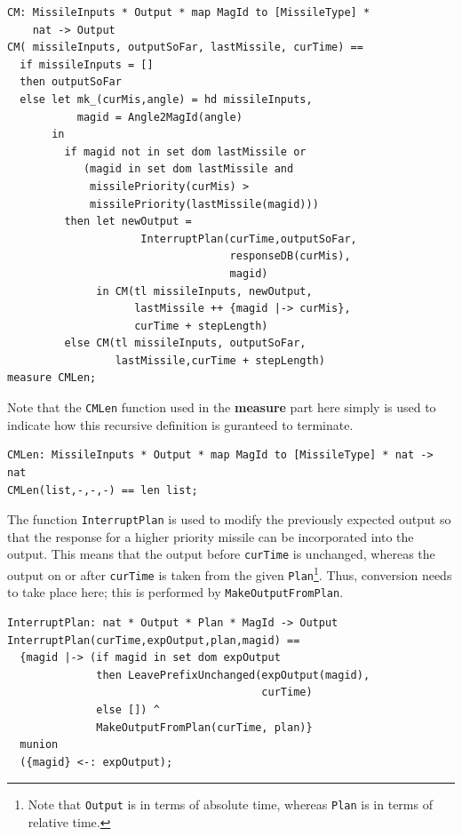 \documentclass{overturerepchap}
\begin{document}
\begin{lstlisting}
CM: MissileInputs * Output * map MagId to [MissileType] * 
    nat -> Output
CM( missileInputs, outputSoFar, lastMissile, curTime) ==
  if missileInputs = []
  then outputSoFar
  else let mk_(curMis,angle) = hd missileInputs,
           magid = Angle2MagId(angle)
       in
         if magid not in set dom lastMissile or
            (magid in set dom lastMissile and
             missilePriority(curMis) > 
             missilePriority(lastMissile(magid)))
         then let newOutput = 
                     InterruptPlan(curTime,outputSoFar,
                                   responseDB(curMis),
                                   magid)
              in CM(tl missileInputs, newOutput, 
                    lastMissile ++ {magid |-> curMis},
                    curTime + stepLength)
         else CM(tl missileInputs, outputSoFar, 
                 lastMissile,curTime + stepLength)
measure CMLen;
\end{lstlisting}

\noindent Note that the \texttt{CMLen} function used in the
          {\bf\ttfamily measure} part here simply is used to indicate
          how this recursive definition is guranteed to terminate.

\begin{lstlisting}
CMLen: MissileInputs * Output * map MagId to [MissileType] * nat -> nat
CMLen(list,-,-,-) == len list;
\end{lstlisting}

The function \texttt{InterruptPlan} is used to modify the previously
expected output so that the response for a higher priority missile can
be incorporated into the output. This means that the output before
\texttt{curTime} is unchanged, whereas the output on or after \texttt{curTime}
is taken from the given \texttt{Plan}\footnote{Note that \texttt{Output} is in
terms of absolute time, whereas \texttt{Plan} is in terms of relative time.}.
Thus, conversion needs to take place here; this is performed by
\texttt{MakeOutputFromPlan}.

\begin{lstlisting}
InterruptPlan: nat * Output * Plan * MagId -> Output
InterruptPlan(curTime,expOutput,plan,magid) ==
  {magid |-> (if magid in set dom expOutput
              then LeavePrefixUnchanged(expOutput(magid), 
                                        curTime)
              else []) ^
              MakeOutputFromPlan(curTime, plan)} 
  munion
  ({magid} <-: expOutput);
\end{lstlisting}
\end{document}
